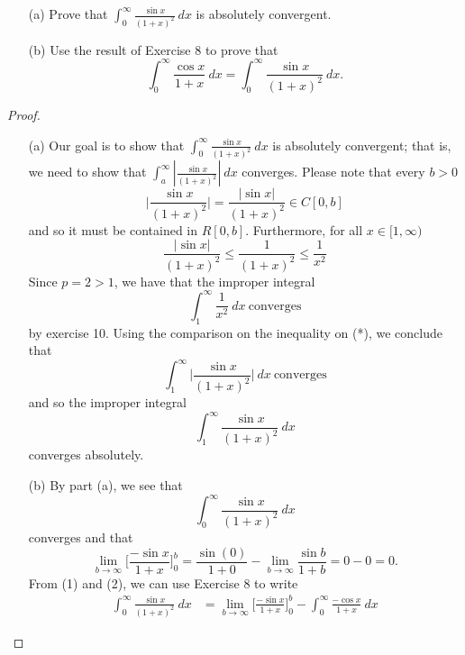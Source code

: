 \documentclass[a4paper]{article}
\begin{document}
\begin{problem}
   \begin{enumerate}
       \item[(a)] Prove that \( \int_{ 0 }^{ \infty  }  \frac{ \sin x  }{ (1+x)^{2} }  \ dx  \) is absolutely convergent.
        \item[(b)] Use the result of Exercise 8 to prove that 
            \[  \int_{ 0 }^{ \infty  } \frac{ \cos x  }{  1 + x  }   \ dx = \int_{ 0 }^{ \infty  }  \frac{ \sin x  }{ (1+x)^{2} }  \ dx. \]
   \end{enumerate} 
\end{problem}
\begin{proof}
\begin{enumerate}
    \item[(a)] Our goal is to show that \( \int_{ 0 }^{ \infty  }  \frac{ \sin x  }{ (1+x)^{2} }  \ dx   \) is absolutely convergent; that is, we need to show that \( \int_{ a }^{ \infty  }  | \frac{ \sin x  }{  (1+x)^{2} }  |   \ dx  \) converges. Please note that every \( b > 0  \) 
        \[ \Big| \frac{ \sin x  }{  (1+x)^{2} }  \Big|   =  \frac{ | \sin  x  |   }{  (1 + x)^{2} } \in C[0,b] \]
        and so it must be contained in \( R[0,b] \). Furthermore, for all \( x \in [1,\infty) \)
        \[  \frac{ | \sin x   |   }{  (1+x)^{2} }  \leq \frac{ 1 }{ (1+x)^{2} } \leq \frac{ 1 }{ x^{2} } \tag{*}  \]
        Since \( p = 2  > 1 \), we have that the improper integral 
        \[  \int_{ 1 }^{ \infty  }  \frac{ 1 }{ x^{2} }  \ dx \ \text{converges} \]
        by exercise 10. Using the comparison on the inequality on (*), we conclude that 
        \[  \int_{ 1 }^{ \infty  }  \Big| \frac{ \sin x  }{  (1+x)^{2} }  \Big|  \ dx \ \text{converges} \]
        and so the improper integral
        \[  \int_{ 1 }^{ \infty  }  \frac{ \sin x  }{  (1+x)^{2} }  \ dx  \]
        converges absolutely.
    \item[(b)] By part (a), we see that 
        \[  \int_{ 0 }^{ \infty  }  \frac{ \sin x  }{  (1+x)^{2} }  \ dx \tag{1}  \]
        converges and that 
        \[  \lim_{ b \to \infty  }  \Big[ \frac{ - \sin x  }{  1 + x } \Big]_{0}^{b} = \frac{ \sin(0) }{ 1 + 0 }  - \lim_{ b \to \infty  }  \frac{ \sin b  }{  1 + b  } =  0 - 0 = 0.  \tag{2}\]
        From (1) and (2), we can use Exercise 8 to write 
        \begin{align*}
            \int_{ 0 }^{ \infty  }  \frac{ \sin x  }{  (1+x)^{2} }  \ dx &= \lim_{ b \to \infty  } \Big[ \frac{  - \sin x  }{  1 + x } \Big]_{0}^{b}  - \int_{ 0 }^{ \infty  }  \frac{ -\cos x  }{ 1 + x  }  \ dx

\end{align*}
\end{enumerate}
\end{proof}
\end{document}
